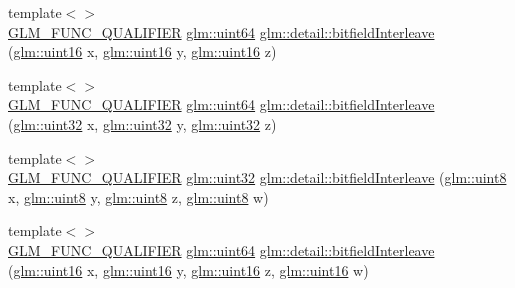 \begin{DoxyCompactItemize}
\item 
{\footnotesize template$<$$>$ }\\\hyperlink{setup_8hpp_a33fdea6f91c5f834105f7415e2a64407}{G\+L\+M\+\_\+\+F\+U\+N\+C\+\_\+\+Q\+U\+A\+L\+I\+F\+I\+ER} \hyperlink{group__gtc__type__precision_gae3632bf9b37da66233d78930dd06378a}{glm\+::uint64} \hyperlink{namespaceglm_1_1detail_aceed48a30e6dc4f2c64945a60369d73d}{glm\+::detail\+::bitfield\+Interleave} (\hyperlink{group__gtc__type__precision_gad8c2939e1fdd8e5828b31d95c52255d5}{glm\+::uint16} x, \hyperlink{group__gtc__type__precision_gad8c2939e1fdd8e5828b31d95c52255d5}{glm\+::uint16} y, \hyperlink{group__gtc__type__precision_gad8c2939e1fdd8e5828b31d95c52255d5}{glm\+::uint16} z)
\item 
{\footnotesize template$<$$>$ }\\\hyperlink{setup_8hpp_a33fdea6f91c5f834105f7415e2a64407}{G\+L\+M\+\_\+\+F\+U\+N\+C\+\_\+\+Q\+U\+A\+L\+I\+F\+I\+ER} \hyperlink{group__gtc__type__precision_gae3632bf9b37da66233d78930dd06378a}{glm\+::uint64} \hyperlink{namespaceglm_1_1detail_a7f6421e0b1180ec986fd91d8eb2d1cc9}{glm\+::detail\+::bitfield\+Interleave} (\hyperlink{group__gtc__type__precision_ga202b6a53c105fcb7e531f9b443518451}{glm\+::uint32} x, \hyperlink{group__gtc__type__precision_ga202b6a53c105fcb7e531f9b443518451}{glm\+::uint32} y, \hyperlink{group__gtc__type__precision_ga202b6a53c105fcb7e531f9b443518451}{glm\+::uint32} z)
\item 
{\footnotesize template$<$$>$ }\\\hyperlink{setup_8hpp_a33fdea6f91c5f834105f7415e2a64407}{G\+L\+M\+\_\+\+F\+U\+N\+C\+\_\+\+Q\+U\+A\+L\+I\+F\+I\+ER} \hyperlink{group__gtc__type__precision_ga202b6a53c105fcb7e531f9b443518451}{glm\+::uint32} \hyperlink{namespaceglm_1_1detail_ae3f57ec9a2b938eb31978ccb99f85474}{glm\+::detail\+::bitfield\+Interleave} (\hyperlink{group__gtc__type__precision_ga1a7dcd8aac97cc8020817c94049deff2}{glm\+::uint8} x, \hyperlink{group__gtc__type__precision_ga1a7dcd8aac97cc8020817c94049deff2}{glm\+::uint8} y, \hyperlink{group__gtc__type__precision_ga1a7dcd8aac97cc8020817c94049deff2}{glm\+::uint8} z, \hyperlink{group__gtc__type__precision_ga1a7dcd8aac97cc8020817c94049deff2}{glm\+::uint8} w)
\item 
{\footnotesize template$<$$>$ }\\\hyperlink{setup_8hpp_a33fdea6f91c5f834105f7415e2a64407}{G\+L\+M\+\_\+\+F\+U\+N\+C\+\_\+\+Q\+U\+A\+L\+I\+F\+I\+ER} \hyperlink{group__gtc__type__precision_gae3632bf9b37da66233d78930dd06378a}{glm\+::uint64} \hyperlink{namespaceglm_1_1detail_a3ed141c5adbf2e1209ffe2081d98ba4c}{glm\+::detail\+::bitfield\+Interleave} (\hyperlink{group__gtc__type__precision_gad8c2939e1fdd8e5828b31d95c52255d5}{glm\+::uint16} x, \hyperlink{group__gtc__type__precision_gad8c2939e1fdd8e5828b31d95c52255d5}{glm\+::uint16} y, \hyperlink{group__gtc__type__precision_gad8c2939e1fdd8e5828b31d95c52255d5}{glm\+::uint16} z, \hyperlink{group__gtc__type__precision_gad8c2939e1fdd8e5828b31d95c52255d5}{glm\+::uint16} w)

\end{DoxyCompactItemize}

